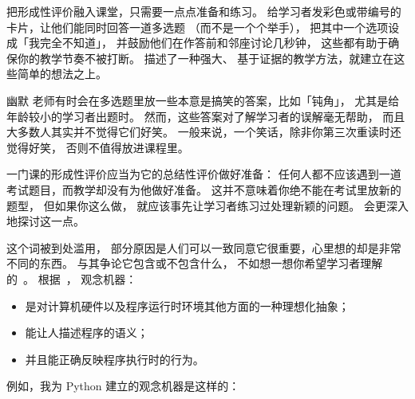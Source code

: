 把形成性评价融入课堂，只需要一点点准备和练习。
给学习者发彩色或带编号的卡片，让他们能同时回答一道多选题
（而不是一个个举手），
把其中一个选项设成「我完全不知道」，
并鼓励他们在作答前和邻座讨论几秒钟，
这些都有助于确保你的教学节奏不被打断。
描述了一种强大、
基于证据的教学方法，就建立在这些简单的想法之上。

\begin{aside}{幽默}
  老师有时会在多选题里放一些本意是搞笑的答案，比如「钝角」，
  尤其是给年龄较小的学习者出题时。
  然而，这些答案对了解学习者的误解毫无帮助，
  而且大多数人其实并不觉得它们好笑。
  一般来说，一个笑话，除非你第三次重读时还觉得好笑，
  否则不值得放进课程里。
\end{aside}

一门课的形成性评价应当为它的总结性评价做好准备：
任何人都不应该遇到一道考试题目，而教学却没有为他做好准备。
这并不意味着你绝不能在考试里放新的题型，
但如果你这么做，
就应该事先让学习者练习过处理新颖的问题。
会更深入地探讨这一点。


这个词被到处滥用，
部分原因是人们可以一致同意它很重要，心里想的却是非常不同的东西。
与其争论它包含或不包含什么，
不如想一想你希望学习者理解的~\cite{DuBo1986}。
根据~\cite{Sorv2013}，
观念机器：

\begin{itemize}

\item
  是对计算机硬件以及程序运行时环境其他方面的一种理想化抽象；

\item
  能让人描述程序的语义；

\item
  并且能正确反映程序执行时的行为。

\end{itemize}

\noindent
例如，我为 Python 建立的观念机器是这样的：

